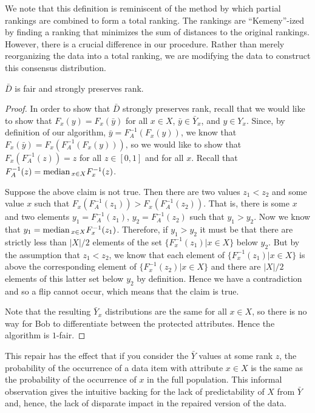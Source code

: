 \label{sec:notes-1}
We note that this definition is reminiscent of the method by which partial rankings are combined to form a total ranking. The rankings are ``Kemeny''-ized by finding a ranking that minimizes the sum of distances to the original rankings. However, there is a crucial difference in our procedure. Rather than merely reorganizing the data into a total ranking, we are modifying the data to construct this consensus distribution. 

\begin{theorem}
$\bar{D}$ is fair and strongly preserves rank.
\end{theorem}

\begin{proof}
In order to show that $\bar{D}$ strongly preserves rank, recall that we would like to show that $F_x(y) = F_x(\bar{y})$ for all $x \in X$, $\bar{y} \in \bar{Y}_x$, and $y \in Y_x$.  Since, by definition of our algorithm, $\bar{y} = F_A^{-1}(F_x(y))$, we know that
$F_x(\bar{y}) = F_x( F^{-1}_A (F_x(y))) \mbox{,} $
so we would like to show that $F_x(F_A^{-1}(z)) = z$ for all $z \in [0,1]$ and for all $x$.  Recall that $F_A^{-1}(z) = \text{median\,}_{x \in X}F_x^{-1}(z)$. 

Suppose the above claim is not true. Then there are two values $z_1 < z_2$ and some value $x$ such that  $F_x(F_A^{-1}(z_1)) > F_x(F_A^{-1}(z_2))$. That is, there is some $x$ and two elements $y_1 = F_A^{-1}(z_1)$, $y_2 = F_A^{-1}(z_2)$ such that $y_1 > y_2$. Now we know that $y_1 = \text{median\,}_{x \in X} F_x^{-1}(z_1)$. Therefore, if $y_1 > y_2$ it must be that there are strictly less than $|X|/2$ elements of the set $\{ F_x^{-1}(z_1) | x \in X\}$ below $y_2$. But by the assumption that $z_1 < z_2$, we know that  each element of $\{ F_x^{-1}(z_1) | x \in X\}$ is above the corresponding element of $\{ F_x^{-1}(z_2) | x \in X\}$ and there are $|X|/2$ elements of this latter set below $y_2$ by definition. Hence we have a contradiction and so a flip cannot occur, which means that the claim is true. 

Note that the resulting  $\bar{Y}_x$ distributions are the same for all $x \in X$, so there is no way for Bob to differentiate between the protected attributes. Hence the algorithm is $1$-fair. 
\end{proof}

This repair has the effect that if you consider the $\bar{Y}$ values at some rank $z$, the probability of the occurrence of a data item with attribute $x \in X$ is the same as the probability of the occurrence of $x$ in the full population.  This informal observation gives the intuitive backing for the lack of predictability of $X$ from $\bar{Y}$ and, hence, the lack of disparate impact in the repaired version of the data.


